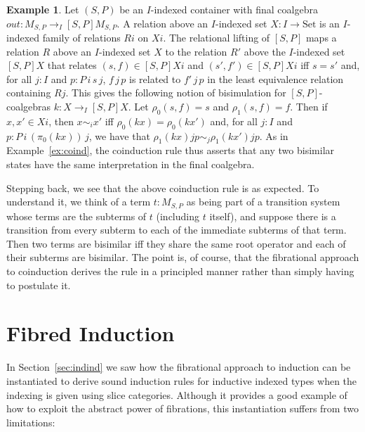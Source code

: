 \documentclass{LMCS}
\newcommand{\ra}{\rightarrow}
\newcommand{\Set}{\mbox{Set}}
\theoremstyle{plain}
\theoremstyle{remark}
\theoremstyle{definition}
\newtheorem{example}[theorem]{Example}
\begin{document}
\begin{example}\label{ex:coindcont}
  Let $(S,P)$ be an $I$-indexed container with final coalgebra
  $\mathit{out}: M_{S,P} \ra_I [S,P]M_{S,P}$. A relation above an
  $I$-indexed set $X:I \ra \Set$ is an $I$-indexed family of relations
  $R i$ on $X i$. The relational lifting of $[S,P]$ maps a relation
  $R$ above an $I$-indexed set $X$ to the relation $R'$ above the
  $I$-indexed set $[S,P]X$ that relates $(s,f) \in [S,P]X i$ and $(s',
  f') \in [S,P]X i$ iff $s = s'$ and, for all $j:I$ and $p\!:\!P \, i
  \, s \, j$, $f \, j \, p$ is related to $f' \, j \, p$ in the least
  equivalence relation containing $R j$. This gives the following
  notion of bisimulation for $[S,P]$-coalgebras $k:X \ra_I [S,P]X$.
  Let $\rho_0 (s,f) = s$ and $\rho_1 (s,f) = f$. Then if $x, x' \in X
  i$, then $x \sim_i x'$ iff $\rho_0 (k x) = \rho_0 (k x')$ and, for
  all $j:I$ and $p\!:\!P\, i \, (\pi_0 (k x)) \, j$, we have that
  $\rho_1 (k x) j p \sim_j \rho_1 (k x') j p$.  As in
  Example~\ref{ex:coind}, the coinduction rule thus asserts that any
  two bisimilar states have the same interpretation in the final
  coalgebra.
\end{example}

Stepping back, we see that the above coinduction rule is as
expected. To understand it, we think of a term $t : M_{S,P}$ as being
part of a transition system whose terms are the subterms of $t$
(including $t$ itself), and suppose there is a transition from every
subterm to each of the immediate subterms of that term. Then two terms
are bisimilar iff they share the same root operator and each of their
subterms are bisimilar. The point is, of course, that the fibrational
approach to coinduction derives the rule in a principled manner rather
than simply having to postulate it. 

\section{Fibred Induction}\label{sec:fibind}

In Section~\ref{sec:indind} we saw how the fibrational approach to
induction can be instantiated to derive sound induction rules for
inductive indexed types when the indexing is given using slice
categories. Although it provides a good example of how to exploit the
abstract power of fibrations, this instantiation suffers from two
limitations:

\vspace*{0.1in}
\end{document}

